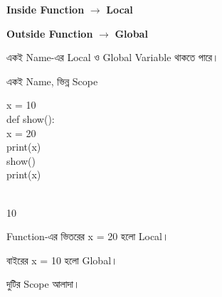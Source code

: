 \begin{rememberbox}

\begin{center}

\textbf{Inside Function}
\(\longrightarrow\)
\textbf{Local}

\qquad

\textbf{Outside Function}
\(\longrightarrow\)
\textbf{Global}

\end{center}

\end{rememberbox}



একই Name-এর Local ও Global Variable থাকতে পারে।

\begin{codeoutputbox}{একই Name, ভিন্ন Scope}

\noindent
\begin{minipage}[t]{0.52\linewidth}
\codeheading

\begin{english}
\ttfamily
x = 10\\[0.5mm]
def show():\\
\hspace*{4mm}x = 20\\
\hspace*{4mm}print(x)\\[0.5mm]
show()\\
print(x)
\end{english}

\end{minipage}
\hfill
\begin{minipage}[t]{0.44\linewidth}
\outputheading

\begin{english}
\\
10
\end{english}

\medskip

Function-এর ভিতরের
\textenglish{\ttfamily x = 20}
হলো Local।

বাইরের
\textenglish{\ttfamily x = 10}
হলো Global।

দুটির Scope আলাদা।

\end{minipage}

\end{codeoutputbox}


